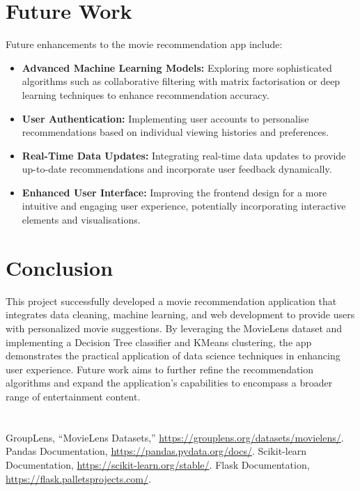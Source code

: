 \documentclass[conference]{IEEEtran}
\begin{document}
\section{Future Work}
Future enhancements to the movie recommendation app include:
\begin{itemize}
    \item \textbf{Advanced Machine Learning Models:} Exploring more sophisticated algorithms such as collaborative filtering with matrix factorisation or deep learning techniques to enhance recommendation accuracy.
    \item \textbf{User Authentication:} Implementing user accounts to personalise recommendations based on individual viewing histories and preferences.
    \item \textbf{Real-Time Data Updates:} Integrating real-time data updates to provide up-to-date recommendations and incorporate user feedback dynamically.
    \item \textbf{Enhanced User Interface:} Improving the frontend design for a more intuitive and engaging user experience, potentially incorporating interactive elements and visualisations.
\end{itemize}

\section{Conclusion}
This project successfully developed a movie recommendation application that integrates data cleaning, machine learning, and web development to provide users with personalized movie suggestions. By leveraging the MovieLens dataset and implementing a Decision Tree classifier and KMeans clustering, the app demonstrates the practical application of data science techniques in enhancing user experience. Future work aims to further refine the recommendation algorithms and expand the application's capabilities to encompass a broader range of entertainment content.

\section*{}
\begin{thebibliography}{00}
 GroupLens, ``MovieLens Datasets,'' \url{https://grouplens.org/datasets/movielens/}.
 Pandas Documentation, \url{https://pandas.pydata.org/docs/}.
 Scikit-learn Documentation, \url{https://scikit-learn.org/stable/}.
 Flask Documentation, \url{https://flask.palletsprojects.com/}.
\end{thebibliography}
\newpage
\onecolumn
\end{document}
